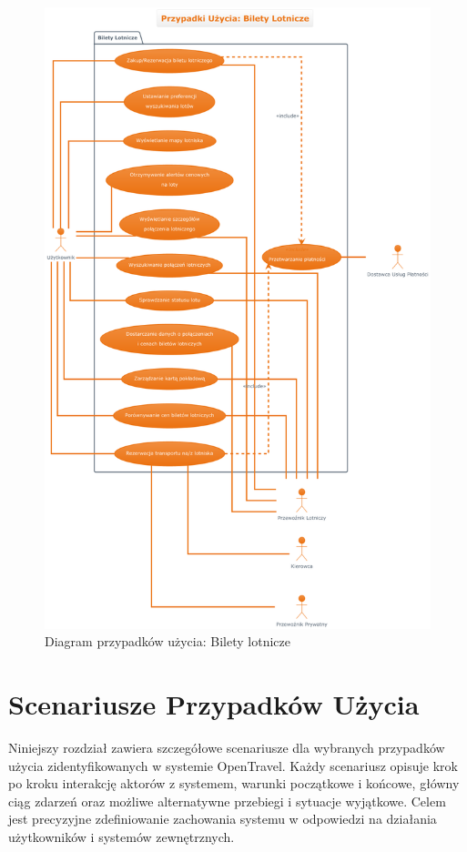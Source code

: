 \documentclass[a4paper,12pt]{article}
\begin{document}
\begin{figure}[H]
    \centering
    \includegraphics[width=0.8\linewidth]{diagramy/przypadki_uzycia/images/diagram_bilety_lotnicze_1.png}
    \caption{Diagram przypadków użycia: Bilety lotnicze}
    \label{fig:diag_bl_1}
\end{figure}


























\newpage
\section{Scenariusze Przypadków Użycia}
\label{sec:scenarios}
Niniejszy rozdział zawiera szczegółowe scenariusze dla wybranych przypadków użycia zidentyfikowanych w systemie OpenTravel. Każdy scenariusz opisuje krok po kroku interakcję aktorów z systemem, warunki początkowe i końcowe, główny ciąg zdarzeń oraz możliwe alternatywne przebiegi i sytuacje wyjątkowe. Celem jest precyzyjne zdefiniowanie zachowania systemu w odpowiedzi na działania użytkowników i systemów zewnętrznych.
\end{document}
